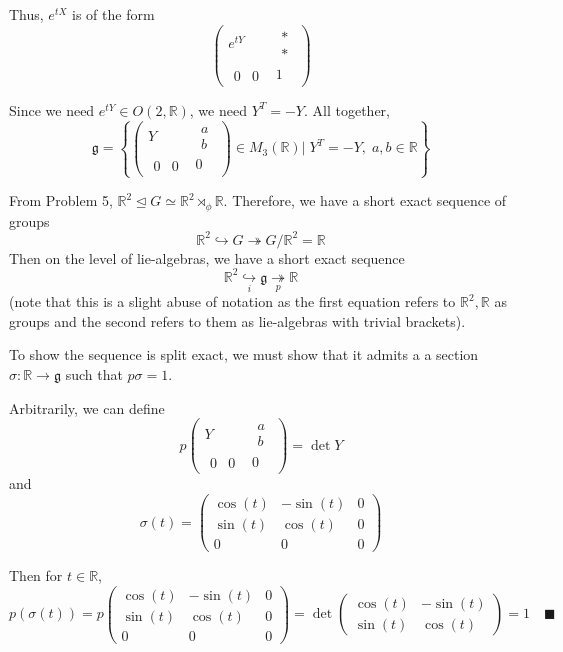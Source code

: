\documentclass[11pt]{article}
\newcommand{\R}{\mathbb{R}}
\newcommand{\gf}{\mathfrak{g}}
\newcommand{\qed}{\quad \blacksquare}
\begin{document}
		Thus, $e^{tX}$ is of the form 
		\[\begin{pmatrix}
			e^{tY} & \begin{matrix}
				*\\
				*
			\end{matrix}\\
			\begin{matrix}
				0 & 0
			\end{matrix} & 1
		\end{pmatrix}\]

		Since we need $e^{tY} \in O(2, \R)$, we need $Y^T = -Y$. All together, 
		\[\gf = \left\{\begin{pmatrix}
			Y & \begin{matrix}
				a\\ b
			\end{matrix}\\ 
			\begin{matrix}
				0 & 0
			\end{matrix} & 0
		\end{pmatrix} \in M_3(\R) \bigg\vert \; Y^T = -Y,\;  a, b \in \R\right\}\]

		From Problem 5, $\R^2 \trianglelefteq G \simeq \R^2 \rtimes_{\phi} \R$. Therefore, we have a short exact sequence of groups 
		\[\R^2 \hookrightarrow G \twoheadrightarrow G/\R^2 = \R\]
		Then on the level of lie-algebras, we have a short exact sequence 
		\[\R^2 \underset{i}{\hookrightarrow} \gf \underset{p}{\twoheadrightarrow} \R\]
		(note that this is a slight abuse of notation as the first equation refers to $\R^2, \R$ as groups and the second refers to them as lie-algebras with trivial brackets). 

		To show the sequence is split exact, we must show that it admits a a section $\sigma: \R \to \gf$ such that $p\sigma = 1$.

		Arbitrarily, we can define 
		\[p\begin{pmatrix}
			Y & \begin{matrix}
				a\\ b
			\end{matrix}\\ 
			\begin{matrix}
				0 & 0
			\end{matrix} & 0
		\end{pmatrix} = \det Y\]  
		and 
		\[\sigma(t) = \begin{pmatrix}
			\cos(t) & -\sin(t) & 0\\
			\sin(t) & \cos(t) & 0\\
			0 & 0 & 0
		\end{pmatrix}\] 

		Then for $t \in \R$,
		\[p(\sigma(t)) = p\begin{pmatrix}
			\cos(t) & -\sin(t) & 0\\
			\sin(t) & \cos(t) & 0\\
			0 & 0 & 0
		\end{pmatrix} = \det \begin{pmatrix}
			\cos(t) & -\sin(t)\\
			\sin(t) & \cos(t)
		\end{pmatrix} = 1 \qed\]
	\color{black}
\end{document}
